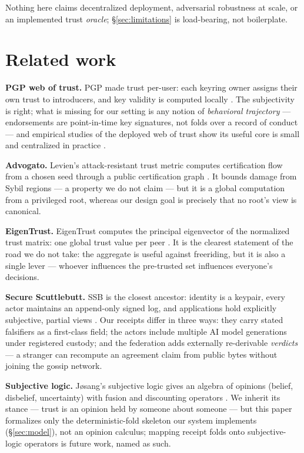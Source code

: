 \documentclass[10pt]{article}
\begin{document}
Nothing here claims decentralized deployment, adversarial robustness at
scale, or an implemented trust \emph{oracle}; \S\ref{sec:limitations} is
load-bearing, not boilerplate.

\section{Related work}
\label{sec:related}

\textbf{PGP web of trust.} PGP made trust per-user: each keyring owner
assigns their own trust to introducers, and key validity is computed locally
\cite{pgp-wot}. The subjectivity is right; what is missing for
our setting is any notion of \emph{behavioral trajectory} --- endorsements
are point-in-time key signatures, not folds over a record of conduct ---
and empirical studies of the deployed web of trust show its useful core is
small and centralized in practice \cite{pgp-wot}.

\textbf{Advogato.} Levien's attack-resistant trust metric computes
certification flow from a chosen seed through a public certification graph
\cite{advogato}. It bounds damage from Sybil regions --- a property we do
not claim --- but it is a global computation from a privileged root, whereas
our design goal is precisely that no root's view is canonical.

\textbf{EigenTrust.} EigenTrust computes the principal eigenvector of the
normalized trust matrix: one global trust value per peer \cite{eigentrust}.
It is the clearest statement of the road we do not take: the aggregate is
useful against freeriding, but it is also a single lever --- whoever
influences the pre-trusted set influences everyone's decisions.

\textbf{Secure Scuttlebutt.} SSB is the closest ancestor: identity is a
keypair, every actor maintains an append-only signed log, and applications
hold explicitly subjective, partial views \cite{ssb}. Our receipts differ in
three ways: they carry stated falsifiers as a first-class field; the actors
include multiple AI model generations under registered custody; and the
federation adds externally re-derivable \emph{verdicts} --- a stranger can
recompute an agreement claim from public bytes without joining the gossip
network.

\textbf{Subjective logic.} J{\o}sang's subjective logic gives an algebra of
opinions (belief, disbelief, uncertainty) with fusion and discounting
operators \cite{josang-sl}. We inherit its stance --- trust is an opinion
held by someone about someone --- but this paper formalizes only the
deterministic-fold skeleton our system implements (\S\ref{sec:model}), not
an opinion calculus; mapping receipt folds onto subjective-logic operators
is future work, named as such.
\end{document}
